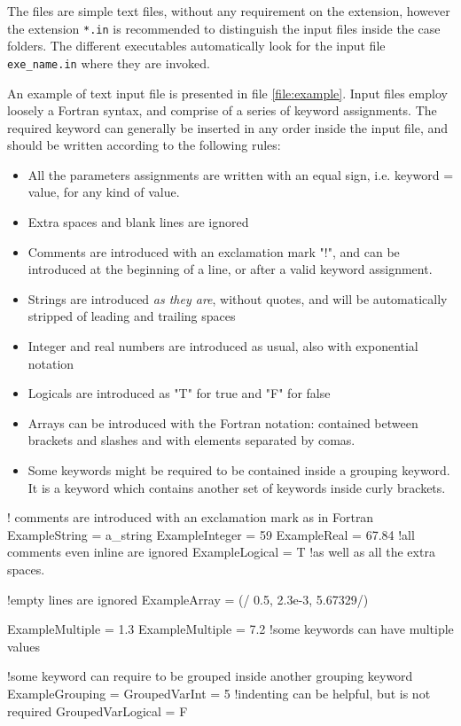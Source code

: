 The files are simple text files, without any requirement on the extension, however the extension \texttt{*.in} is recommended to distinguish the input files inside the case folders. The different executables automatically look for the input file \texttt{exe\_name.in} where they are invoked. 

An example of text input file is presented in file \ref{file:example}. Input files employ loosely a Fortran syntax, and comprise of a series of keyword assignments.
The required keyword can generally be inserted in any order inside the input file, and should be written according to the following rules:
\begin{itemize}
\item All the parameters assignments are written with an equal sign, i.e. keyword = value, for any kind of value.
\item Extra spaces and blank lines are ignored
\item Comments are introduced with an exclamation mark "!", and can be introduced at the beginning of a line, or after a valid keyword assignment.
\item Strings are introduced \emph{as they are}, without quotes, and will be automatically stripped of leading and trailing spaces
\item Integer and real numbers are introduced as usual, also with exponential notation
\item Logicals are introduced as "T" for true and "F" for false
\item Arrays can be introduced with the Fortran notation: contained between brackets and slashes and with elements separated by comas. 
\item Some keywords might be required to be contained inside a grouping keyword. It is a keyword which contains another set of keywords inside curly brackets. 
\end{itemize}

\begin{inputfile}[frame=single, caption={example input file}, label={file:example}]
! comments are introduced with an exclamation mark as in Fortran
ExampleString   = a_string
ExampleInteger  = 59
ExampleReal     = 67.84 !all comments even inline are ignored
ExampleLogical  = T     !as well as all the extra spaces.

!empty lines are ignored
ExampleArray = (/ 0.5, 2.3e-3, 5.67329/)

ExampleMultiple = 1.3
ExampleMultiple = 7.2 !some keywords can have multiple values

!some keyword can require to be grouped inside another grouping keyword
ExampleGrouping = {
	GroupedVarInt = 5 !indenting can be helpful, but is not required
    GroupedVarLogical = F
}
\end{inputfile}

